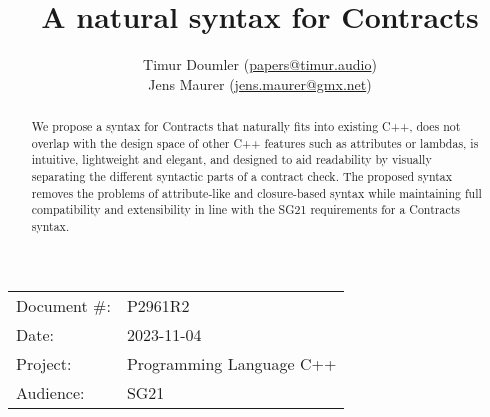 



\usepackage{titlesec}
\usepackage{tocloft}


\newcommand{\changelocaltocdepth}[1]{%
  \addtocontents{toc}{\protect\setcounter{tocdepth}{#1}}%
  \setcounter{tocdepth}{#1}%
}

\setcounter{tocdepth}{3}



\title{A natural syntax for Contracts}
\author{ Timur Doumler \small(\href{mailto:papers@timur.audio}{papers@timur.audio})\\
Jens Maurer \small(\href{mailto:jens.maurer@gmx.net}{jens.maurer@gmx.net})}
\date{}
\maketitle

\begin{tabular}{ll}
Document \#: & P2961R2 \\
Date: &2023-11-04\\
Project: & Programming Language C++ \\
Audience: & SG21
\end{tabular}

\begin{abstract}
We propose a syntax for Contracts that naturally fits into existing C++, does not overlap with the design space of other C++ features such as attributes or lambdas, is intuitive, lightweight and elegant, and designed to aid readability by visually separating the different syntactic parts of a contract check. The proposed syntax removes the problems of attribute-like and closure-based syntax while maintaining full compatibility and extensibility in line with the SG21 requirements for a Contracts syntax.
\end{abstract}


\tableofcontents*

